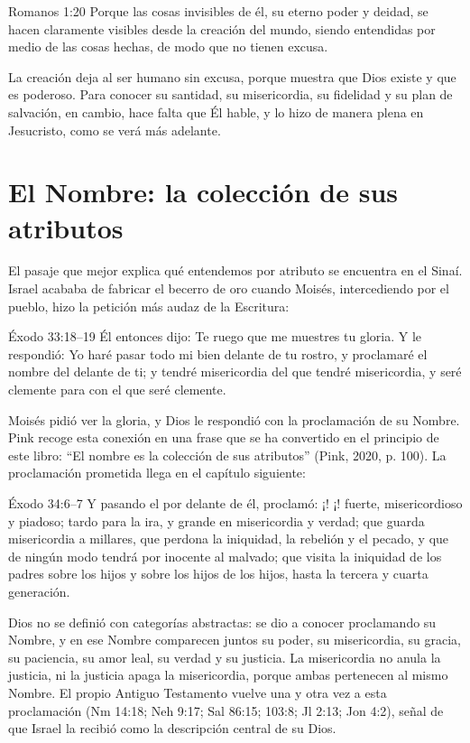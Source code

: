\begin{verso}{Romanos 1:20}
Porque las cosas invisibles de él, su eterno poder y deidad, se hacen claramente visibles desde la creación del mundo, siendo entendidas por medio de las cosas hechas, de modo que no tienen excusa.
\end{verso}

La creación deja al ser humano sin excusa, porque muestra que Dios existe y que es poderoso. Para conocer su santidad, su misericordia, su fidelidad y su plan de salvación, en cambio, hace falta que Él hable, y lo hizo de manera plena en Jesucristo, como se verá más adelante.

\section{El Nombre: la colección de sus atributos}

El pasaje que mejor explica qué entendemos por atributo se encuentra en el Sinaí. Israel acababa de fabricar el becerro de oro cuando Moisés, intercediendo por el pueblo, hizo la petición más audaz de la Escritura:

\begin{verso}{Éxodo 33:18–19}
Él entonces dijo: Te ruego que me muestres tu gloria. Y le respondió: Yo haré pasar todo mi bien delante de tu rostro, y proclamaré el nombre del \SENOR{} delante de ti; y tendré misericordia del que tendré misericordia, y seré clemente para con el que seré clemente.
\end{verso}

Moisés pidió ver la gloria, y Dios le respondió con la proclamación de su Nombre. Pink recoge esta conexión en una frase que se ha convertido en el principio de este libro: “El nombre es la colección de sus atributos” (Pink, 2020, p. 100). La proclamación prometida llega en el capítulo siguiente:

\begin{verso}{Éxodo 34:6–7}
Y pasando el \SENOR{} por delante de él, proclamó: ¡\SENOR! ¡\SENOR! fuerte, misericordioso y piadoso; tardo para la ira, y grande en misericordia y verdad; que guarda misericordia a millares, que perdona la iniquidad, la rebelión y el pecado, y que de ningún modo tendrá por inocente al malvado; que visita la iniquidad de los padres sobre los hijos y sobre los hijos de los hijos, hasta la tercera y cuarta generación.
\end{verso}

Dios no se definió con categorías abstractas: se dio a conocer proclamando su Nombre, y en ese Nombre comparecen juntos su poder, su misericordia, su gracia, su paciencia, su amor leal, su verdad y su justicia. La misericordia no anula la justicia, ni la justicia apaga la misericordia, porque ambas pertenecen al mismo Nombre. El propio Antiguo Testamento vuelve una y otra vez a esta proclamación (Nm 14:18; Neh 9:17; Sal 86:15; 103:8; Jl 2:13; Jon 4:2), señal de que Israel la recibió como la descripción central de su Dios.
